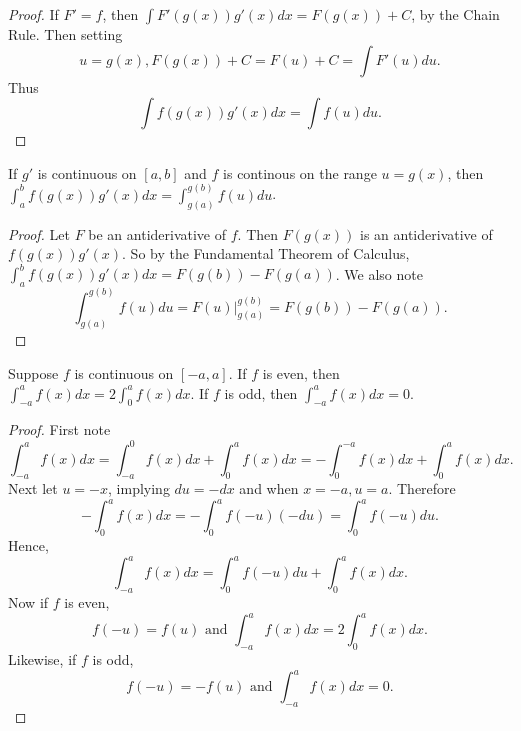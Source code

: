 \documentclass[a4paper,8pt]{article}
\begin{document}
\begin{outline}
    \begin{proof}
      If \(F'=f\), then \(\int F'(g(x))g'(x)dx = F(g(x)) + C\), by the Chain Rule. Then setting
      \[ u = g(x), F(g(x)) + C = F(u) + C = \int F'(u)du\text{.} \] Thus
      \[ \int f(g(x))g'(x)dx = \int f(u)du\text{.} \]
    \end{proof}

    If \(g'\) is continuous on \([a, b]\) and \(f\) is continous on the range \(u=g(x)\), then
    \(\int_a^b f(g(x))g'(x)dx = \int_{g(a)}^{g(b)} f(u)du\).

    \begin{proof}
      Let \(F\) be an antiderivative of \(f\). Then \(F(g(x))\) is an antiderivative of \(f(g(x))g'(x)\). So
      by the Fundamental Theorem of Calculus, \(\int_a^b f(g(x))g'(x)dx = F(g(b)) - F(g(a))\). We also note
      \[ \int_{g(a)}^{g(b)} f(u)du = F(u)\vert_{g(a)}^{g(b)} = F(g(b))-F(g(a))\text{.} \]
    \end{proof}

    Suppose \(f\) is continuous on \([-a, a]\). If \(f\) is even, then \(\int_{-a}^{a}f(x)dx = 2\int_0^a f(x)dx\).
    If \(f\) is odd, then \(\int_{-a}^a f(x)dx = 0\).

    \begin{proof}
      First note
      \[
        \int_{-a}^a f(x)dx
          = \int_{-a}^0 f(x)dx + \int_0^a f(x)dx
          = -\int_0^{-a} f(x)dx + \int_0^a f(x)dx\text{.}
      \]
      Next let \(u = -x\), implying \(du = -dx\) and when \(x = -a, u = a\). Therefore
      \[
        -\int_0^a f(x)dx = -\int_0^a f(-u)(-du) = \int_0^a f(-u)du\text{.}
      \]
      Hence, \[\int_{-a}^a f(x)dx = \int_0^a f(-u)du + \int_0^a f(x)dx\text{.}\]
      Now if \(f\) is even, \[f(-u)=f(u)\text{ and }\int_{-a}^a f(x)dx = 2\int_0^a f(x)dx\text{.}\]
      Likewise, if \(f\) is odd, \[f(-u) = -f(u)\text{ and }\int_{-a}^a f(x)dx = 0\text{.}\]
    \end{proof}

\end{outline}
\end{document}
